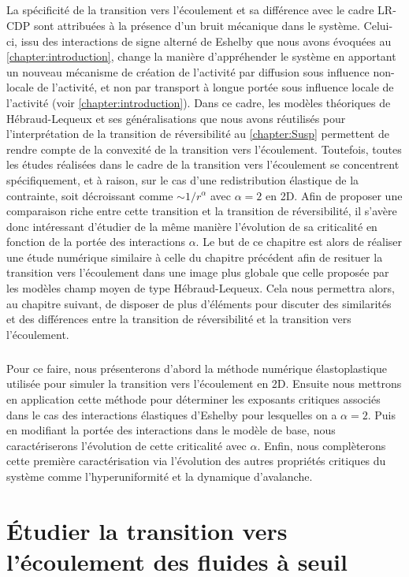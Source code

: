 \subparagraph{}La spécificité de la transition vers l'écoulement et sa différence avec le cadre LR-CDP sont attribuées à la présence d'un bruit mécanique dans le système. Celui-ci, issu des interactions de signe alterné de Eshelby que nous avons évoquées au \autoref{chapter:introduction}, change la manière d'appréhender le système en apportant un nouveau mécanisme de création de l'activité par diffusion sous influence non-locale de l'activité, et non par transport à longue portée sous influence locale de l'activité (voir \autoref{chapter:introduction}). Dans ce cadre, les modèles théoriques de Hébraud-Lequeux et ses généralisations que nous avons réutilisés pour l'interprétation de la transition de réversibilité au  \autoref{chapter:Susp} permettent de rendre compte de la convexité de la transition vers l'écoulement. Toutefois, toutes les études réalisées dans le cadre de la transition vers l'écoulement se concentrent spécifiquement, et à raison, sur le cas d'une redistribution élastique de la contrainte, soit décroissant comme $\sim 1/r^\alpha$ avec $\alpha = 2$ en 2D. Afin de proposer une comparaison riche entre cette transition et la transition de réversibilité, il s'avère donc intéressant d'étudier de la même manière l'évolution de sa criticalité en fonction de la portée des interactions $\alpha$. Le but de ce chapitre est alors de réaliser une étude numérique similaire à celle du chapitre précédent afin de resituer la transition vers l'écoulement dans une image plus globale que celle proposée par les modèles champ moyen de type Hébraud-Lequeux. Cela nous permettra alors, au chapitre suivant, de disposer de plus d'éléments pour discuter des similarités et des différences entre la transition de réversibilité et la transition vers l'écoulement.

\subparagraph{}Pour ce faire, nous présenterons d'abord la méthode numérique élastoplastique utilisée pour simuler la transition vers l'écoulement en 2D. Ensuite nous mettrons en application cette méthode pour déterminer les exposants critiques associés dans le cas des interactions élastiques d'Eshelby pour lesquelles on a $\alpha=2$. Puis en modifiant la portée des interactions dans le modèle de base, nous caractériserons l'évolution de cette criticalité avec $\alpha$. Enfin, nous complèterons cette première caractérisation via l'évolution des autres propriétés critiques du système comme l'hyperuniformité et la dynamique d'avalanche.

\section{Étudier la transition vers l'écoulement des fluides à seuil}

